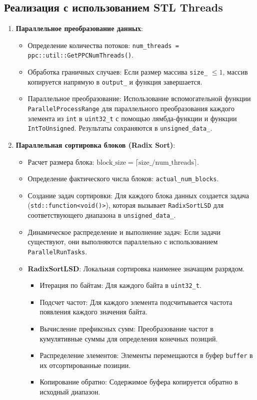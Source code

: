 \documentclass[12pt,a4paper]{extarticle}
\begin{document}
	\subsection{Реализация с использованием STL Threads}
\begin{enumerate}

    \item \textbf{Параллельное преобразование данных}:
    \begin{itemize}
        \item Определение количества потоков: \texttt{num\_threads = ppc::util::GetPPCNumThreads()}.
        \item Обработка граничных случаев: Если размер массива \texttt{size\_} $\le 1$, массив копируется напрямую в \texttt{output\_} и функция завершается.
        \item Параллельное преобразование: Использование вспомогательной функции \texttt{ParallelProcessRange} для параллельного преобразования каждого элемента из \texttt{int} в \texttt{uint32\_t} с помощью лямбда-функции и функции \texttt{IntToUnsigned}. Результаты сохраняются в \texttt{unsigned\_data\_}.
    \end{itemize}
    
    \item \textbf{Параллельная сортировка блоков (Radix Sort)}:
    \begin{itemize}
        \item Расчет размера блока: $\mathrm{block\_size} = \lceil \mathrm{size\_} / \mathrm{num\_threads} \rceil$.
        \item Определение фактического числа блоков: \texttt{actual\_num\_blocks}.
        \item Создание задач сортировки: Для каждого блока данных создается задача (\texttt{std::function<void()>}), которая вызывает \texttt{RadixSortLSD} для соответствующего диапазона в \texttt{unsigned\_data\_}.
        \item Динамическое распределение и выполнение задач: Если задачи существуют, они выполняются параллельно с использованием \texttt{ParallelRunTasks}.
        \item \textbf{RadixSortLSD}: Локальная сортировка наименее значащим разрядом.
        \begin{itemize}
            \item Итерация по байтам: Для каждого байта в \texttt{uint32\_t}.
            \item Подсчет частот: Для каждого элемента подсчитывается частота появления каждого значения байта.
            \item Вычисление префиксных сумм: Преобразование частот в кумулятивные суммы для определения конечных позиций.
            \item Распределение элементов: Элементы перемещаются в буфер \texttt{buffer} в их отсортированные позиции.
            \item Копирование обратно: Содержимое буфера копируется обратно в исходный диапазон.
        \end{itemize}
    \end{itemize}
    

\end{enumerate}
\end{document}

